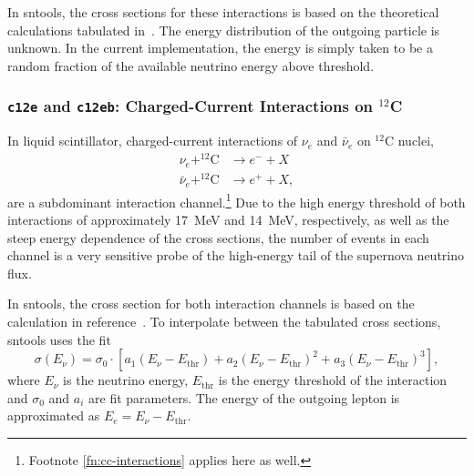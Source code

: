 \documentclass[11pt, oneside]{article}
\newcommand{\nue}{\ensuremath{\nu_e}\xspace}
\newcommand{\nuebar}{\ensuremath{\bar{\nu}_e}\xspace}
\begin{document}
In sntools, the cross sections for these interactions is based on the theoretical calculations tabulated in~\cite{Suzuki2018}.
The energy distribution of the outgoing particle is unknown.
In the current implementation, the energy is simply taken to be a random fraction of the available neutrino energy above threshold.


\subsubsection{\texttt{c12e} and \texttt{c12eb}: Charged-Current Interactions on $^{12}$C}
In liquid scintillator, charged-current interactions of \nue and \nuebar on $^{12}$C nuclei,
\begin{align}
\nue + ^{12}\text{C} &\rightarrow e^- + X \\
\nuebar + ^{12}\text{C} &\rightarrow e^+ + X,
\end{align}
are a subdominant interaction channel.\footnote{Footnote \ref{fn:cc-interactions} applies here as well.}
Due to the high energy threshold of both interactions of approximately \SI{17}{MeV} and \SI{14}{MeV}, respectively, as well as the steep energy dependence of the cross sections, the number of events in each channel is a very sensitive probe of the high-energy tail of the supernova neutrino flux.

In sntools, the cross section for both interaction channels is based on the calculation in reference~\cite{Kolbe1999}.
To interpolate between the tabulated cross sections, sntools uses the fit
\begin{equation}
\sigma (E_\nu) = \sigma_0 \cdot \left[ a_1 (E_\nu - E_\text{thr}) + a_2 (E_\nu - E_\text{thr})^2 + a_3 (E_\nu - E_\text{thr})^3 \right],
\end{equation}
where $E_\nu$ is the neutrino energy, $E_\text{thr}$ is the energy threshold of the interaction and $\sigma_0$ and $a_i$ are fit parameters.
The energy of the outgoing lepton is approximated as $E_e = E_\nu - E_\text{thr}$.
\end{document}
